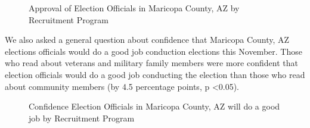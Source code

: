 \documentclass[
  11pt,
  a4paper,
]{article}
\begin{document}
\begin{figure}

\caption{\label{fig-q27-likert}Approval of Election Officials in
Maricopa County, AZ by Recruitment Program}


\end{figure}%

We also asked a general question about confidence that Maricopa County,
AZ elections officials would do a good job conduction elections this
November. Those who read about veterans and military family members were
more confident that election officials would do a good job conducting
the election than those who read about community members (by 4.5
percentage points, p \textless0.05).

\begin{figure}

\caption{\label{fig-20-likert}Confidence Election Officials in Maricopa
County, AZ will do a good job by Recruitment Program}


\end{figure}%
\end{document}
